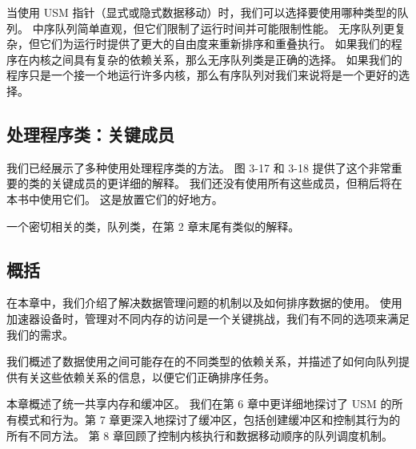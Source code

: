 当使用 USM 指针（显式或隐式数据移动）时，我们可以选择要使用哪种类型的队列。 中序队列简单直观，但它们限制了运行时间并可能限制性能。 无序队列更复杂，但它们为运行时提供了更大的自由度来重新排序和重叠执行。 如果我们的程序在内核之间具有复杂的依赖关系，那么无序队列类是正确的选择。 如果我们的程序只是一个接一个地运行许多内核，那么有序队列对我们来说将是一个更好的选择。

\subsection{处理程序类：关键成员}
我们已经展示了多种使用处理程序类的方法。 图 3-17 和 3-18 提供了这个非常重要的类的关键成员的更详细的解释。 我们还没有使用所有这些成员，但稍后将在本书中使用它们。 这是放置它们的好地方。

一个密切相关的类，队列类，在第 2 章末尾有类似的解释。

\subsection{概括}
在本章中，我们介绍了解决数据管理问题的机制以及如何排序数据的使用。 使用加速器设备时，管理对不同内存的访问是一个关键挑战，我们有不同的选项来满足我们的需求。

我们概述了数据使用之间可能存在的不同类型的依赖关系，并描述了如何向队列提供有关这些依赖关系的信息，以便它们正确排序任务。

本章概述了统一共享内存和缓冲区。 我们在第 6 章中更详细地探讨了 USM 的所有模式和行为。第 7 章更深入地探讨了缓冲区，包括创建缓冲区和控制其行为的所有不同方法。 第 8 章回顾了控制内核执行和数据移动顺序的队列调度机制。
